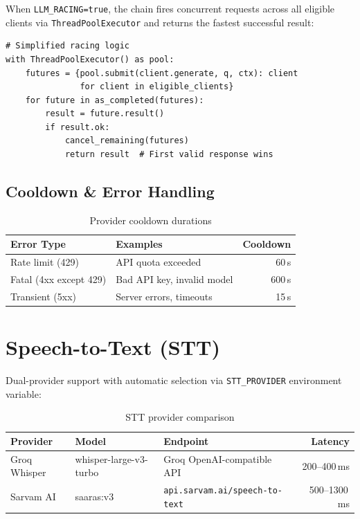 \documentclass[12pt,a4paper]{article}
\begin{document}
When \texttt{LLM\_RACING=true}, the chain fires concurrent requests across all eligible clients via \texttt{ThreadPoolExecutor} and returns the fastest successful result:

\begin{lstlisting}
# Simplified racing logic
with ThreadPoolExecutor() as pool:
    futures = {pool.submit(client.generate, q, ctx): client 
               for client in eligible_clients}
    for future in as_completed(futures):
        result = future.result()
        if result.ok:
            cancel_remaining(futures)
            return result  # First valid response wins
\end{lstlisting}

\subsection{Cooldown \& Error Handling}

\begin{table}[H]
\centering
\begin{tabular}{llr}
\toprule
\textbf{Error Type} & \textbf{Examples} & \textbf{Cooldown} \\
\midrule
Rate limit (429)        & API quota exceeded          & 60\,s \\
Fatal (4xx except 429)  & Bad API key, invalid model  & 600\,s \\
Transient (5xx)         & Server errors, timeouts     & 15\,s \\
\bottomrule
\end{tabular}
\caption{Provider cooldown durations}
\end{table}


\section{Speech-to-Text (STT)}

Dual-provider support with automatic selection via \texttt{STT\_PROVIDER} environment variable:

\begin{table}[H]
\centering
\begin{tabular}{lllr}
\toprule
\textbf{Provider} & \textbf{Model} & \textbf{Endpoint} & \textbf{Latency} \\
\midrule
Groq Whisper & whisper-large-v3-turbo & Groq OpenAI-compatible API & 200--400\,ms \\
Sarvam AI    & saaras:v3              & \texttt{api.sarvam.ai/speech-to-text} & 500--1300\,ms \\
\bottomrule
\end{tabular}
\caption{STT provider comparison}
\end{table}
\end{document}
